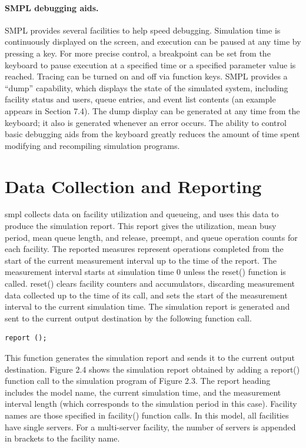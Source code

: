 \paragraph{SMPL debugging aids.} SMPL provides several facilities to help speed debugging.
Simulation time is continuously displayed on the screen, and execution can be
paused at any time by pressing a key. For more precise control, a breakpoint
can be set from the keyboard to pause execution at a specified time or a
specified parameter value is reached. Tracing can be turned on and off via
function keys. SMPL provides a ``dump'' capability, which displays the state
of the simulated system, including facility status and users, queue entries,
and event list contents (an example appears in Section 7.4). The dump display
can be generated at any time from the keyboard; it also is generated whenever
an error occurs. The ability to control basic debugging aids from the keyboard
greatly reduces the amount of time spent modifying and recompiling simulation
programs.

\section{Data Collection and Reporting}
\label{sec:smpl-data-collection-reporting}

smpl collects data on facility utilization and queueing, and uses this data to
produce the simulation report. This report gives the utilization, mean busy
period, mean queue length, and release, preempt, and queue operation counts
for each facility. The reported measures represent operations completed from
the start of the current measurement interval up to the time of the report. The
measurement interval starts at simulation time 0 unless the reset() function
is called. reset() clears facility counters and accumulators, discarding
measurement data collected up to the time of its call, and sets the start of
the measurement interval to the current simulation time. The simulation report
is generated and sent to the current output destination by the following
function call.

\begin{verbatim}
report ();
\end{verbatim}

This function generates the simulation report and sends it to the current
output destination. Figure 2.4 shows the simulation report obtained by adding
a report() function call to the simulation program of Figure 2.3. The report
heading includes the model name, the current simulation time, and the
measurement interval length (which corresponds to the simulation period in
this case). Facility names are those specified in facility() function calls. In
this model, all facilities have single servers. For a multi-server facility,
the number of servers is appended in brackets to the facility name.

